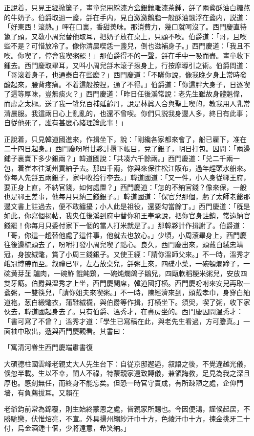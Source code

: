 正說着，只見王經掀簾子，畫童兒用綵漆方盒銀鑲雕漆茶鍾，㧱了兩盞酥油白糖熬的牛奶子。伯爵取過一盞，㧱在手内，見白瀲瀲鵝脂一般酥油飄浮在盞内，説道：「好東西！滚熱。」呷在口裏，香甜羙味。那消費力，幾口就呵沒了。西門慶直待篦了頭，又敎小周兒替他取耳，把奶子放在桌上，只顧不喫。伯爵道：「哥，且喫些不是？可惜放冷了。像你清晨喫恁一盞兒，倒也滋補身子。」西門慶道：「我且不喫。你喫了，停會我喫粥罷！」那伯爵得不的一聲，㧱在手中一吸而盡。畫童收下鍾去。西門慶取畢耳，又呌小周兒㧱木滚子㨰身上，行按摩導引之術。伯爵問道：「哥滚着身子，也通泰自在些麽？」西門慶道：「不瞞你說，像我晚夕身上常時發酸起來，腰背疼痛。不着這般按捏，通了不得。」伯爵道：「你這胖大身子，日逐喫了這等厚味，豈無痰火？」西門慶道：「昨日任後溪常說：老先生雖故身體魁偉，而虚之太極。送了我一罐兒百補延齡丹，說是林眞人合與聖上喫的，教我用人乳常清晨服。我這兩日心上亂亂的，也還不曾喫。你們只説我身邊人多，終日有此事；自従他死了，誰有甚麽心緒理論此事！」

正說着，只見韓道國進來，作揖坐下，說：「剛纔各家都來會了，船已雇下，准在二十四日起身。」西門慶吩咐甘夥計攢下帳目，兌了銀子，明日打包。因問：「兩邊鋪子裏賣下多少銀兩？」韓道國說：「共凑六千餘兩。」西門慶道：「兑二千兩一包，着崔本往湖州買紬子去。那四千兩，你與來保往松江販布，過年趕頭水船來。你每人先㧱五兩銀子，家中收拾行李去。」韓道國道：「又一件，小人身従鄆王府，要正身上直，不納官錢，如何處置？」西門慶道：「怎的不納官錢？像來保，一般也是鄆王差事，他每月只納三錢銀子。」韓道國道：「保官兒那個，虧了太師老爺那邊文書上註過去，便不敢纏擾；小人此是祖役，還要勾當餘丁。」西門慶道：「旣是如此，你寫個揭帖，我央任後溪到府中替你和王奉承說，把你官身註銷，常遠納官錢罷！你每月只委付家下一個的當人打米就是了。」那韓夥計作揖謝了。伯爵道：「哥，你這一趟替他處了這件事，他就去也放心。」少頃，小周滚畢身上，西門慶往後邊梳頭去了，吩咐打發小周兒喫了點心。良久，西門慶出來，頭戴白絨忠靖冠，身披絨氅，賞了小周三錢銀子。又使王經：「請你溫師父來。」不一時，溫秀才峨冠博帶而至。叙禮已畢，左右放桌兒，㧱粥上來，四碟小菜，一碗頓爛蹄子，一碗黄芽韮𤆑驢肉，一碗鮓𤆑餛飩鷄，一碗炖爛鴿子鶵兒，四甌軟稻粳米粥兒，安放四雙牙筯。伯爵與溫秀才上坐，西門慶関席，韓道國打横。西門慶吩咐來安兒再取一盞粥，一雙筷兒，「請你姐夫來喫粥。」不一時，陳經濟來到，頭戴孝巾，身穿白紬道袍，葱白緞氅衣，蒲鞋絨襪，與伯爵等作揖，打横坐下。須臾，喫了粥，收下家伙去，韓道國起身去了。只有伯爵、溫秀才，在書房坐的。西門慶因問溫秀才：「書可寫了不曾？」溫秀才道：「學生已寫稿在此，與老先生看過，方可謄真。」一面袖中取出，遞與西門慶觀看。其書曰：

\begin{myquote}[\markfont]
\hspace*{4em}「寓清河眷生西門慶端肅書復

大碩德柱國雲峰老親丈大人先生台下：自従京邸邂逅，叙語之後，不覺違越光儀，倐忽半載。生以不幸，閨人不祿，特蒙親家遠致賻儀，兼領誨教，足見為我之深且厚也。感刻無任，而終身不能忘矣。但恐一時官守責成，有所疎陋之處，企仰門墻，有負薦拔耳。又賴在

老爺鈞前常為錦覆，則生始終蒙恩之處，皆親家所賜也。今因便鴻，謹候起居，不勝馳戀，伏惟炤亮，不宣。外具揚州縐紗汗巾十方，色綾汗巾十方，揀金挑牙二十付，烏金酒鍾十個，少將遠意，希笑納。」
\end{myquote}

